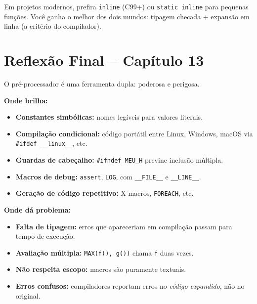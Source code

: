 \documentclass[12pt,a4paper]{article}
\begin{document}
\begin{respostabox}
\begin{boaprática}
  Em projetos modernos, prefira \texttt{inline} (C99+) ou \texttt{static inline}
  para pequenas funções. Você ganha o melhor dos dois mundos: tipagem checada
  + expansão em linha (a critério do compilador).
\end{boaprática}
\end{respostabox}

\newpage

\section*{Reflexão Final -- Capítulo 13}

\begin{tcolorbox}[colback=deitellightblue,colframe=deitelblue,
  title={\bfseries O pré-processador: ferramenta de duas faces}]

O pré-processador é uma ferramenta dupla: poderosa e perigosa.

\textbf{Onde brilha:}
\begin{itemize}[noitemsep]
  \item \textbf{Constantes simbólicas:} nomes legíveis para valores literais.
  \item \textbf{Compilação condicional:} código portátil entre Linux, Windows,
  macOS via \texttt{\#ifdef \_\_linux\_\_}, etc.
  \item \textbf{Guardas de cabeçalho:} \texttt{\#ifndef MEU\_H} previne inclusão
  múltipla.
  \item \textbf{Macros de debug:} \texttt{assert}, \texttt{LOG}, com
  \texttt{\_\_FILE\_\_} e \texttt{\_\_LINE\_\_}.
  \item \textbf{Geração de código repetitivo:} X-macros, \texttt{FOREACH}, etc.
\end{itemize}

\textbf{Onde dá problema:}
\begin{itemize}[noitemsep]
  \item \textbf{Falta de tipagem:} erros que apareceriam em compilação passam
  para tempo de execução.
  \item \textbf{Avaliação múltipla:} \texttt{MAX(f(), g())} chama \texttt{f}
  duas vezes.
  \item \textbf{Não respeita escopo:} macros são puramente textuais.
  \item \textbf{Erros confusos:} compiladores reportam erros no \textit{código
  expandido}, não no original.
\end{itemize}


\end{tcolorbox}
\end{document}

